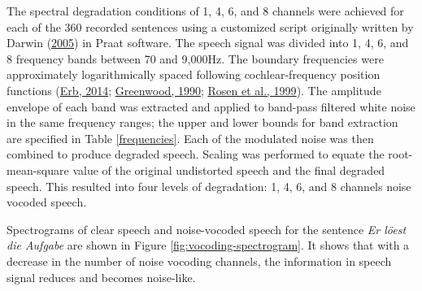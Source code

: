 \documentclass[a4paper, nobind]{templates/ociamthesis}
\begin{document}
The spectral degradation conditions of 1, 4, 6, and 8 channels were achieved for each of the 360 recorded sentences using a customized script originally written by Darwin (\protect\hyperlink{ref-Darwin2005}{2005}) in Praat software.
The speech signal was divided into 1, 4, 6, and 8 frequency bands between 70 and 9,000Hz.
The boundary frequencies were approximately logarithmically spaced following cochlear-frequency position functions (\protect\hyperlink{ref-Erb2014}{Erb, 2014}; \protect\hyperlink{ref-Greenwood1990}{Greenwood, 1990}; \protect\hyperlink{ref-Rosen1999}{Rosen et al., 1999}).
The amplitude envelope of each band was extracted and applied to band-pass filtered white noise in the same frequency ranges;
the upper and lower bounds for band extraction are specified in Table \ref{frequencies}.
Each of the modulated noise was then combined to produce degraded speech.
Scaling was performed to equate the root-mean-square value of the original undistorted speech and the final degraded speech.
This resulted into four levels of degradation: 1, 4, 6, and 8 channels noise vocoded speech.

Spectrograms of clear speech and noise-vocoded speech for the sentence \emph{Er löest die Aufgabe} are shown in Figure \ref{fig:vocoding-spectrogram}. It shows that with a decrease in the number of noise vocoding channels, the information in speech signal reduces and becomes noise-like.
\end{document}

